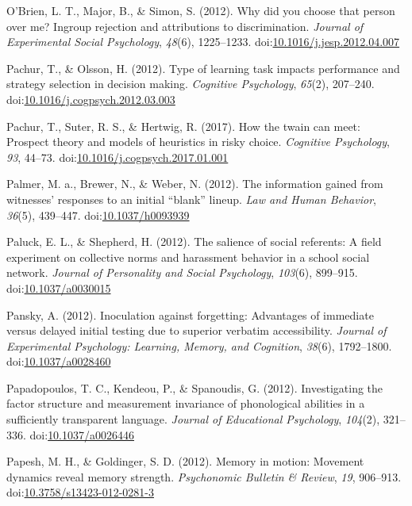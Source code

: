 \documentclass[english,man]{apa6}
\theoremstyle{definition}
\theoremstyle{definition}
\theoremstyle{definition}
\theoremstyle{remark}
\begin{document}
\hypertarget{ref-OBrien2012}{}
O'Brien, L. T., Major, B., \& Simon, S. (2012). Why did you choose that
person over me? Ingroup rejection and attributions to discrimination.
\emph{Journal of Experimental Social Psychology}, \emph{48}(6),
1225--1233.
doi:\href{https://doi.org/10.1016/j.jesp.2012.04.007}{10.1016/j.jesp.2012.04.007}

\hypertarget{ref-Pachur2012}{}
Pachur, T., \& Olsson, H. (2012). Type of learning task impacts
performance and strategy selection in decision making. \emph{Cognitive
Psychology}, \emph{65}(2), 207--240.
doi:\href{https://doi.org/10.1016/j.cogpsych.2012.03.003}{10.1016/j.cogpsych.2012.03.003}

\hypertarget{ref-Pachur2017}{}
Pachur, T., Suter, R. S., \& Hertwig, R. (2017). How the twain can meet:
Prospect theory and models of heuristics in risky choice.
\emph{Cognitive Psychology}, \emph{93}, 44--73.
doi:\href{https://doi.org/10.1016/j.cogpsych.2017.01.001}{10.1016/j.cogpsych.2017.01.001}

\hypertarget{ref-Palmer2012}{}
Palmer, M. a., Brewer, N., \& Weber, N. (2012). The information gained
from witnesses' responses to an initial ``blank'' lineup. \emph{Law and
Human Behavior}, \emph{36}(5), 439--447.
doi:\href{https://doi.org/10.1037/h0093939}{10.1037/h0093939}

\hypertarget{ref-Paluck2012}{}
Paluck, E. L., \& Shepherd, H. (2012). The salience of social referents:
A field experiment on collective norms and harassment behavior in a
school social network. \emph{Journal of Personality and Social
Psychology}, \emph{103}(6), 899--915.
doi:\href{https://doi.org/10.1037/a0030015}{10.1037/a0030015}

\hypertarget{ref-Pansky2012}{}
Pansky, A. (2012). Inoculation against forgetting: Advantages of
immediate versus delayed initial testing due to superior verbatim
accessibility. \emph{Journal of Experimental Psychology: Learning,
Memory, and Cognition}, \emph{38}(6), 1792--1800.
doi:\href{https://doi.org/10.1037/a0028460}{10.1037/a0028460}

\hypertarget{ref-Papadopoulos2012}{}
Papadopoulos, T. C., Kendeou, P., \& Spanoudis, G. (2012). Investigating
the factor structure and measurement invariance of phonological
abilities in a sufficiently transparent language. \emph{Journal of
Educational Psychology}, \emph{104}(2), 321--336.
doi:\href{https://doi.org/10.1037/a0026446}{10.1037/a0026446}

\hypertarget{ref-Papesh2012}{}
Papesh, M. H., \& Goldinger, S. D. (2012). Memory in motion: Movement
dynamics reveal memory strength. \emph{Psychonomic Bulletin \& Review},
\emph{19}, 906--913.
doi:\href{https://doi.org/10.3758/s13423-012-0281-3}{10.3758/s13423-012-0281-3}
\end{document}
